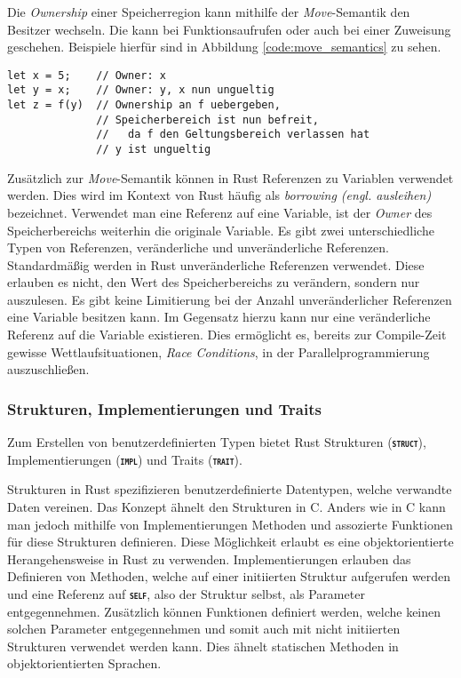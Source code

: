 Die \textit{Ownership} einer Speicherregion kann mithilfe der \textit{Move}-Semantik den Besitzer wechseln.
Die kann bei Funktionsaufrufen oder auch bei einer Zuweisung geschehen. Beispiele hierfür sind in Abbildung
\ref{code:move_semantics} zu sehen.\cite{rustBook}

\begin{lstlisting}[float,caption={Beispieldarstellung der \textit{Move}-Semantik},label=code:move_semantics]
let x = 5;    // Owner: x
let y = x;    // Owner: y, x nun ungueltig
let z = f(y)  // Ownership an f uebergeben,
              // Speicherbereich ist nun befreit,
              //   da f den Geltungsbereich verlassen hat
              // y ist ungueltig
\end{lstlisting}\cite{rustBook}

Zusätzlich zur \textit{Move}-Semantik können in Rust Referenzen zu Variablen verwendet werden. Dies wird im Kontext
von Rust häufig als \textit{borrowing (engl. ausleihen)} bezeichnet. Verwendet man eine Referenz auf eine Variable,
ist der \textit{Owner} des Speicherbereichs weiterhin die originale Variable. Es gibt zwei unterschiedliche
Typen von Referenzen, veränderliche und unveränderliche Referenzen. Standardmäßig werden in Rust unveränderliche
Referenzen verwendet. Diese erlauben es nicht, den Wert des Speicherbereichs zu verändern, sondern nur auszulesen.
Es gibt keine Limitierung bei der Anzahl unveränderlicher Referenzen eine Variable besitzen kann. Im Gegensatz
hierzu kann nur eine veränderliche Referenz auf die Variable existieren. Dies ermöglicht es, bereits zur
Compile-Zeit gewisse Wettlaufsituationen, \textit{Race Conditions}, in der Parallelprogrammierung auszuschließen. 

\subsubsection{Strukturen, Implementierungen und Traits}

Zum Erstellen von benutzerdefinierten Typen bietet Rust Strukturen (\texttt{\textsc{\textbf{struct}}}),
Implementierungen (\texttt{\textsc{\textbf{impl}}}) und Traits (\texttt{\textsc{\textbf{trait}}}).

Strukturen in Rust spezifizieren benutzerdefinierte Datentypen, welche verwandte Daten vereinen. Das Konzept
ähnelt den Strukturen in C. Anders wie in C kann man jedoch mithilfe von Implementierungen Methoden und assozierte
Funktionen für diese Strukturen definieren.
Diese Möglichkeit erlaubt es eine objektorientierte Herangehensweise in Rust zu verwenden.
Implementierungen erlauben das Definieren von Methoden, welche auf einer initiierten Struktur aufgerufen werden
und eine Referenz auf \texttt{\textsc{\textbf{self}}}, also der Struktur selbst, als Parameter entgegennehmen.
Zusätzlich können Funktionen definiert werden, welche keinen solchen Parameter entgegennehmen und somit auch mit
nicht initiierten Strukturen verwendet werden kann. Dies ähnelt statischen Methoden in objektorientierten
Sprachen.

